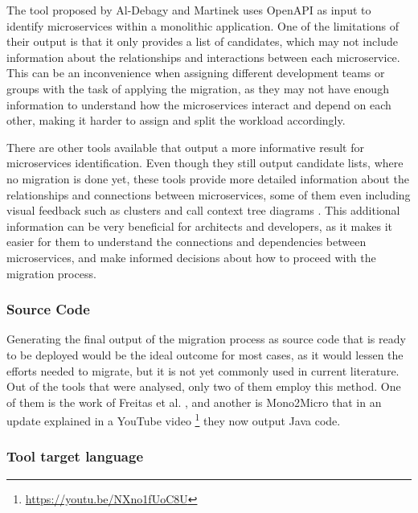 \documentclass[conference]{IEEEtran}
\begin{document}
The tool proposed by Al-Debagy and Martinek  uses OpenAPI as
input to identify microservices within a monolithic application. One of the
limitations of their output is that it only provides a list of candidates,
which may not include information about the relationships and interactions
between each microservice. This can be an inconvenience when assigning
different development teams or groups with the task of applying the migration,
as they may not have enough information to understand how the microservices
interact and depend on each other, making it harder to assign and split the
workload accordingly.

There are other tools available that output a more informative result for
microservices identification. Even though they still output candidate lists,
where no migration is done yet, these tools provide more detailed information
about the relationships and connections between microservices, some of them
even including visual feedback such as clusters and call context tree diagrams
. This additional information can be very beneficial
for architects and developers, as it makes it easier for them to understand the
connections and dependencies between microservices, and make informed decisions
about how to proceed with the migration process.

\subsubsection*{Source Code}

Generating the final output of the migration process as source code that is
ready to be deployed would be the ideal outcome for most cases, as it would
lessen the efforts needed to migrate, but it is not yet commonly used in
current literature. Out of the tools that were analysed, only two of them
employ this method. One of them is the work of Freitas et al.
, and another is Mono2Micro
 that in an update explained in a YouTube video
\footnote{\url{https://youtu.be/NXno1fUoC8U}} they now output Java code.

\subsubsection{Tool target language}
\end{document}
